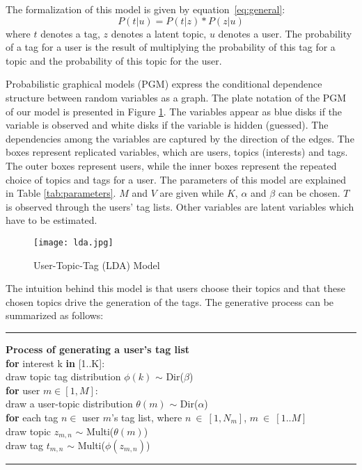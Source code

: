 The formalization of this model is given by equation~\ref{eq:general}: 
\begin{equation}
P(t|u)=P(t|z)*P(z|u)
\label{eq:general}
\end{equation}
where $t$ denotes a tag, $z$ denotes a latent topic, $u$ denotes a user. The probability of a tag for a user is the result of multiplying the probability of this tag for a topic and the probability of this topic for the user.

Probabilistic graphical models (PGM) express the conditional dependence structure between random variables as a graph. 
The plate notation of the PGM of our model is presented in Figure \ref{fig:lda}. 
The variables appear as blue disks if the variable is observed and white disks if the variable is hidden (guessed).
The dependencies among the variables are captured by the direction of the edges. 
The boxes represent replicated variables, which are users, topics (interests) and tags. The outer boxes represent users, while the inner boxes represent the repeated choice of topics and tags for a user. The parameters of this model are explained in Table \ref{tab:parameters}.
$M$ and $V$ are given while $K$, $\alpha$ and $\beta$ can be chosen. $T$ is observed through the users' tag lists. Other variables are latent variables which have to be estimated.

\begin{figure}[htbp]\centering
\texttt{[image: lda.jpg]}  %
\caption{User-Topic-Tag (LDA) Model}
\label{fig:lda}
\end{figure}

The intuition behind this model is that users choose their topics and that these chosen topics drive the generation of the tags.
The generative process can be summarized as follows:

\noindent\rule[0.5ex]{\linewidth}{1pt}
\textbf{Process of generating a user's tag list}\\
\noindent \textbf{for} interest k \textbf{in} [1..K]:\\
\indent draw topic tag distribution $\phi(k)$ $\sim$ Dir($\beta$)\\
\noindent \textbf{for} user $m \in [1,M]$:\\
\indent draw a user-topic distribution $\theta(m)$ $\sim$ Dir($\alpha$)\\  
\indent \textbf{for} each tag $n \in$   user $m$'s tag list, where $n~\in~[1,N_m]$, $m~\in~[1..M]$\\
\indent \indent draw topic $z_{m,n}$  $\sim$ Multi($\theta(m)$)\\
\indent \indent draw tag $t_{m,n}$ $\sim$ Multi($\phi(z_{m,n})$)\\ 
\noindent\rule[0.5ex]{\linewidth}{1pt}

